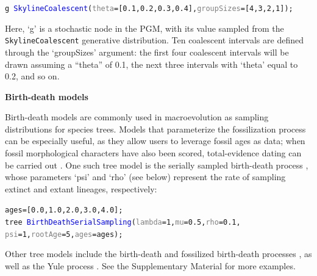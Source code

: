 \documentclass[10pt,letterpaper,table]{article}
\theoremstyle{definition}
\begin{document}
{\small
  \begin{alltt}
    \textcolor{bluishgreen}{g} ~ \textcolor{blue}{SkylineCoalescent}(\textcolor{gray}{theta}=[\textcolor{constant}{0.1}, \textcolor{constant}{0.2}, \textcolor{constant}{0.3}, \textcolor{constant}{0.4}], \textcolor{gray}{groupSizes}=[\textcolor{constant}{4},\textcolor{constant}{3},\textcolor{constant}{2},\textcolor{constant}{1}]);
  \end{alltt}
}

Here, `g' is a stochastic node in the PGM, with its value sampled from the \texttt{SkylineCoalescent} generative distribution. Ten coalescent intervals are defined through the `groupSizes' argument: the first four coalescent intervals will be drawn assuming a ``theta'' of 0.1, the next three intervals with `theta' equal to 0.2, and so on.
\newline

\noindent \textbf{Birth-death models}

Birth-death models are commonly used in macroevolution as sampling distributions for species trees. Models that parameterize the fossilization process can be especially useful, as they allow users to leverage fossil ages as data; when fossil morphological characters have also been scored, total-evidence dating can be carried out \cite{ogilvie21}. One such tree model is the serially sampled birth-death process \cite{stadler2013dating}, whose parameters `psi' and `rho' (see below) represent the rate of sampling extinct and extant lineages, respectively:

{\small
  \begin{alltt}
    ages = [\textcolor{constant}{0.0}, \textcolor{constant}{1.0}, \textcolor{constant}{2.0}, \textcolor{constant}{3.0}, \textcolor{constant}{4.0}];
    \textcolor{bluishgreen}{tree} ~ \textcolor{blue}{BirthDeathSerialSampling}(\textcolor{gray}{lambda}=1, \textcolor{gray}{mu}=\textcolor{constant}{0.5}, \textcolor{gray}{rho}=\textcolor{constant}{0.1},
    \textcolor{gray}{psi}=\textcolor{constant}{1}, \textcolor{gray}{rootAge}=\textcolor{constant}{5}, \textcolor{gray}{ages}=ages);
  \end{alltt}
}

Other tree models include the birth-death \cite{kendall1948generalized} and fossilized birth-death processes \cite{heath2014fossilized}, as well as the Yule process \cite{yule1925ii}. See the Supplementary Material for more examples.
\end{document}
